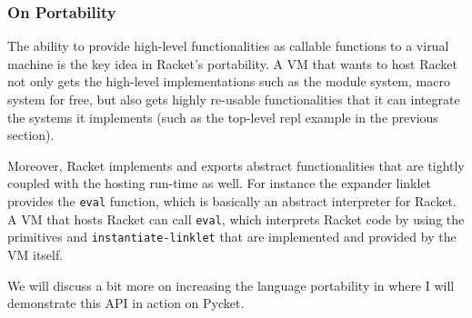 \subsubsection{On Portability}
\label{subsec:portability}

The ability to provide high-level functionalities as callable
functions to a virual machine is the key idea in Racket's
portability. A VM that wants to host Racket not only gets the
high-level implementations such as the module system, macro system for
free, but also gets highly re-usable functionalities that it can
integrate the systems it implements (such as the top-level repl
example in the previous section).

Moreover, Racket implements and exports abstract functionalities that
are tightly coupled with the hosting run-time as well. For instance
the expander linklet provides the \verb|eval| function, which is
basically an abstract interpreter for Racket. A VM that hosts Racket
can call \verb|eval|, which interprets Racket code by using the
primitives and \verb|instantiate-linklet| that are implemented and
provided by the VM itself.

We will discuss a bit more on increasing the language portability in
 where I will demonstrate this API in action on
Pycket.
